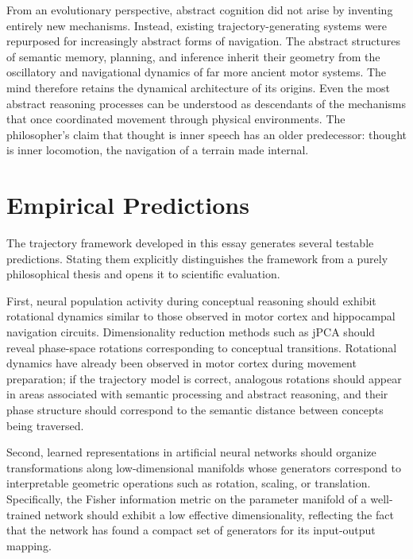 \documentclass[11pt, a4paper]{article}
\theoremstyle{plain}
\theoremstyle{definition}
\theoremstyle{remark}
\begin{document}
From an evolutionary perspective, abstract cognition did not arise by inventing entirely
new mechanisms. Instead, existing trajectory-generating systems were repurposed for
increasingly abstract forms of navigation. The abstract structures of semantic memory,
planning, and inference inherit their geometry from the oscillatory and navigational
dynamics of far more ancient motor systems. The mind therefore retains the dynamical
architecture of its origins. Even the most abstract reasoning processes can be understood
as descendants of the mechanisms that once coordinated movement through physical
environments. The philosopher's claim that thought is inner speech has an older
predecessor: thought is inner locomotion, the navigation of a terrain made internal.


\section{Empirical Predictions}

The trajectory framework developed in this essay generates several testable predictions.
Stating them explicitly distinguishes the framework from a purely philosophical thesis
and opens it to scientific evaluation.

First, neural population activity during conceptual reasoning should exhibit rotational
dynamics similar to those observed in motor cortex and hippocampal navigation circuits.
Dimensionality reduction methods such as jPCA should reveal phase-space rotations
corresponding to conceptual transitions. Rotational dynamics have already been observed
in motor cortex during movement preparation; if the trajectory model is correct,
analogous rotations should appear in areas associated with semantic processing and
abstract reasoning, and their phase structure should correspond to the semantic distance
between concepts being traversed.

Second, learned representations in artificial neural networks should organize
transformations along low-dimensional manifolds whose generators correspond to
interpretable geometric operations such as rotation, scaling, or translation.
Specifically, the Fisher information metric on the parameter manifold of a well-trained
network should exhibit a low effective dimensionality, reflecting the fact that the
network has found a compact set of generators for its input-output mapping.
\end{document}
